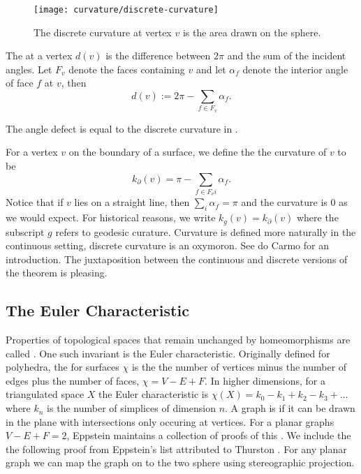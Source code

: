 \begin{figure}[htb]
\centering
\texttt{[image: curvature/discrete-curvature]}
\caption{The discrete curvature at vertex $v$ is the area drawn on the sphere.}
\label{fig:discrete-curvature}
\end{figure}

The  at a vertex $d(v)$ is the difference between $2\pi$ and
the sum of the incident angles.  Let $F_v$ denote the faces containing $v$  
and let $\alpha_f$  denote the interior  angle of face $f$ at $v$, then
$$d(v):=2\pi -\sum_{f\in F_v}\alpha_f.$$

The angle defect is equal to the discrete curvature in .


For a vertex $v$ on the boundary of a surface, we define the the curvature
of $v$  to be 
$$k_{\partial}(v)= \pi-\sum_{f\in F_vi}\alpha_f.$$
Notice that if $v$ lies on a straight line, then $\sum_{i}\alpha_f=\pi$
and the curvature is $0$ as we would expect.
For historical reasons,  we write $k_g(v)=k_{\partial}(v)$
where the subscript $g$ refers to geodesic curature.
Curvature is defined more naturally in the continuous setting,
discrete curvature is an oxymoron.  See do Carmo \cite{doc76} for an introduction.
The juxtaposition between the continuous and discrete versions of the theorem
is pleasing.





\subsection{The Euler Characteristic}

Properties of topological spaces that remain unchanged by homeomorphisms are called
. One such invariant is the Euler characteristic.
Originally defined for polyhedra, the  for surfaces $\chi$ is the 
the number of vertices minus the number of edges plus  the number of faces, $\chi=V-E+F.$
In higher dimensions, for a triangulated space $X$ the Euler characteristic is 
$\chi(X)=k_0-k_1+k_2-k_3+\ldots$ where $k_n$ is the number of simplices of dimension $n.$
A  graph  is  if it can be drawn in the plane with intersections only occuring
at vertices.
For a planar graphs $V-E+F=2$, Eppstein maintains a collection of proofs of this \cite{eppstein-proofs}.
We include the the following proof from Eppstein's list attributed to Thurston
 \cite{thurston}. For any planar graph we can map the graph on to the two sphere
 using stereographic projection.
 
